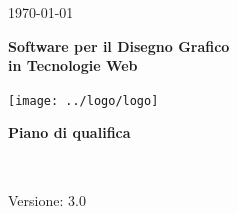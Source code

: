 \usepackage{multirow}
 
\title{\TITOLODOC}
\author{Carollo Mirko}
 

 
\renewcommand{\insertversion}{3.0} %
\renewcommand{\TITOLODOC}{Piano di qualifica} %
\renewcommand{\glosspath}{.\glossario} %
 
\begin{titlepage}
\begin{center}
  \begin{Large}  \today \end{Large}
\end{center}
 
\vspace{20pt}
 
\begin{center}
  \begin{Huge}
        \textbf{\ajax}
  \end{Huge}
\end{center}      
 
\begin{center}
  \begin{large}
        \textbf{Software per il Disegno Grafico\\ in Tecnologie Web}
  \end{large}
\end{center}      
 
\vspace{20pt}
 
\begin{center}
\texttt{[image: ../logo/logo]}
\end{center}
 
\vspace{170pt}
\begin{center} %
  \begin{Huge}
        \textbf{\TITOLODOC}
  \end{Huge}
      \\
\end{center}
\vspace{190pt}
\begin{center}
Versione: \insertversion
\end{center}
\end{titlepage}
 
